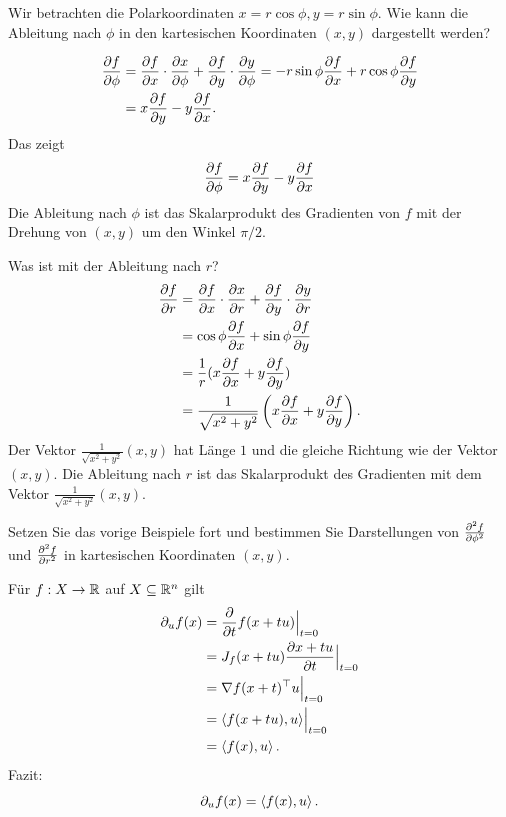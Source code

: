 \begin{bsp} 
	Wir betrachten die Polarkoordinaten $ x= r \cos \phi, y = r \sin \phi$. Wie kann die Ableitung nach $\phi$ in den kartesischen Koordinaten $(x,y)$ dargestellt werden? 
	
	\begin{align*}
		 \frac{\partial f}{\partial \phi} & = \frac{\partial f}{\partial x} \cdot \frac{\partial x}{\partial \phi} + \frac{\partial f}{\partial y} \cdot \frac{\partial y}{\partial \phi} = - r \sin \phi \frac{\partial f}{\partial x} + r \cos \phi \frac{\partial f}{\partial y} \\ & = x \frac{\partial f}{\partial y} - y \frac{\partial f}{\partial x}. 
	\end{align*} 
	Das zeigt 
	\[
		\frac{\partial f}{\partial \phi} = x \frac{\partial f}{\partial y} - y \frac{\partial f}{\partial x}
	\] 
	Die Ableitung nach $\phi$ ist das Skalarprodukt des Gradienten von $f$ mit der Drehung von $(x,y)$ um den Winkel $\pi/2$. 
	
	Was ist mit der Ableitung nach $r$? 
	\begin{align*}
		\frac{\partial f}{\partial r} & = \frac{\partial f}{\partial x} \cdot \frac{\partial x}{\partial r} + \frac{\partial f}{\partial y} \cdot \frac{\partial y}{\partial r} 
		\\ & = \cos \phi \frac{\partial f}{\partial x} + \sin \phi \frac{\partial f}{\partial y} 
		\\ & = \frac{1}{r} ( x \frac{\partial f}{\partial x} + y \frac{\partial f}{\partial y} )
		\\ & = \frac{1}{\sqrt{x^2 + y^2}} \left( x \frac{\partial f}{\partial x} + y \frac{\partial f}{\partial y} \right). 
	\end{align*}
	Der Vektor $\frac{1}{\sqrt{x^2 + y^2}} (x,y)$ hat Länge $1$ und die gleiche Richtung wie der Vektor $(x,y)$. Die Ableitung nach $r$ ist das Skalarprodukt des Gradienten mit dem Vektor $\frac{1}{\sqrt{x^2 + y^2}} (x,y)$. 
\end{bsp} 

\begin{aufg} 
	Setzen Sie das vorige Beispiele fort und bestimmen Sie Darstellungen von $\frac{\partial^2 f}{\partial \phi^2}$ und $\frac{\partial^2 f}{\partial r^2}$ in kartesischen Koordinaten $(x,y)$. 
\end{aufg} 


\begin{bem}
	Für $f : X \to \mathbb{R}$ auf $X \subseteq \mathbb{R}^n$ gilt
	\begin{align*}
		\partial_u f(x) & = \Bigl. \frac{\partial }{\partial t} f(x+ t u) \Bigr|_{t=0} 
		\\ & = \Bigl. J_f(x+ t u) \frac{\partial x+tu}{\partial t} \Bigr|_{t=0}
		\\ & = \Bigl. \nabla f(x+t)^\top u \Bigr|_{t=0} 
		\\ & = \Bigl. \left< f(x+tu) , u \right>  \Bigr|_{t=0}
		\\ & = \left< f(x) , u \right>. 
	\end{align*}
	Fazit: 
	\[
		\partial_u f(x) = \left< f(x) , u \right>. 
	\]
\end{bem} 

